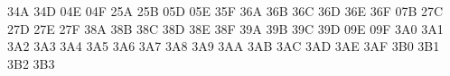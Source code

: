 { \mtsyadef@{}
 \mtsyadef@{}
 \mtsyadef@{}
 \mtsyadef@{}
 \mtsyadef@{}
 \mtsyadef@{}
 \mtsyadef@{}
 \mtsyadef@{}
 \mtsyadef@\blacktriangleleft34A
 \mtsyadef@\vartriangle34D
 \mtsyadef@\blacktriangle04E
 \mtsyadef@\triangledown04F
 \mtsyadef@{}
 \mtsyadef@{}
 \mtsyadef@{}
 \mtsyadef@{}
 \mtsyadef@{}
 \mtsyadef@{}
 \mtsyadef@{}
 \mtsyadef@{}
 \mtsyadef@\barwedge25A
 \mtsyadef@\doublebarwedge25B
 \mtsyadef@\measuredangle05D
 \mtsyadef@\sphericalangle05E
 \mtsyadef@\varpropto35F
 \mtsyadef@{}
 \mtsyadef@{}
 \mtsyadef@{}
 \mtsyadef@{}
 \mtsyadef@{}
 \let\doublecup\Cup
 \mtsyadef@{}
 \let\doublecap\Cap
 \mtsyadef@{}
 \mtsyadef@{}
 \mtsyadef@{}
 \mtsyadef@{}
 \mtsyadef@\subseteqq36A
 \mtsyadef@\supseteqq36B
 \mtsyadef@\bumpeq36C
 \mtsyadef@\Bumpeq36D
 \mtsyadef@\lll36E
 \let\llless\lll
 \mtsyadef@\ggg36F
 \let\gggtr\ggg
 \mtsyadef@{}
 \mtsyadef@{}
 \mtsyadef@{}
 \mtsyadef@{}
 \mtsyadef@{}
 \mtsyadef@\complement07B
 \mtsyadef@\intercal27C
 \mtsyadef@\circledcirc27D
 \mtsyadef@\circledast27E
 \mtsyadef@\circleddash27F
 \mtsyadef@{}
 \mtsyadef@{}
 \mtsyadef@{}
 \mtsyadef@{}
 \mtsyadef@{}
 \mtsyadef@{}
 \mtsyadef@{}
 \mtsyadef@{}
 \mtsyadef@{}
 \mtsyadef@{}
 \mtsyadef@\nleqslant38A
 \mtsyadef@\ngeqslant38B
 \mtsyadef@\lneq38C
 \mtsyadef@\gneq38D
 \mtsyadef@\npreceq38E
 \mtsyadef@\nsucceq38F
 \mtsyadef@{}
 \mtsyadef@{}
 \mtsyadef@{}
 \mtsyadef@{}
 \mtsyadef@{}
 \mtsyadef@{}
 \mtsyadef@{}
 \mtsyadef@{}
 \mtsyadef@{}
 \mtsyadef@{}
 \mtsyadef@\lnapprox39A
 \mtsyadef@\gnapprox39B
 \mtsyadef@\nsim39C
 \mtsyadef@\ncong39D
 \mtsyadef@\diagup09E
 \mtsyadef@\diagdown09F
 \mtsyadef@\varsubsetneq3A0
 \mtsyadef@\varsupsetneq3A1
 \mtsyadef@\nsubseteqq3A2
 \mtsyadef@\nsupseteqq3A3
 \mtsyadef@\subsetneqq3A4
 \mtsyadef@\supsetneqq3A5
 \mtsyadef@\varsubsetneqq3A6
 \mtsyadef@\varsupsetneqq3A7
 \mtsyadef@\subsetneq3A8
 \mtsyadef@\supsetneq3A9
 \mtsyadef@\nsubseteq3AA
 \mtsyadef@\nsupseteq3AB
 \mtsyadef@\nparallel3AC
 \mtsyadef@\nmid3AD
 \mtsyadef@\nshortmid3AE
 \mtsyadef@\nshortparallel3AF
 \mtsyadef@\nvdash3B0
 \mtsyadef@\nVdash3B1
 \mtsyadef@\nvDash3B2
 \mtsyadef@\nVDash3B3
}
